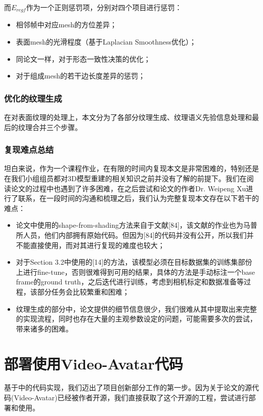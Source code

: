 \documentclass{article}
\begin{document}
而$E_{regf}$作为一个正则惩罚项，分别对四个项目进行惩罚：

\begin{itemize}
	\item 相邻帧中对应mesh的方位差异；
	\item 表面mesh的光滑程度（基于Laplacian Smoothness优化）；
	\item 同论文\cite{paper1}一样，对于形态一致性决策的优化；
	\item 对于组成mesh的若干边长度差异的惩罚；
\end{itemize}

\subsubsection{优化的纹理生成}
在对表面纹理的处理上，本文分为了各部分纹理生成、纹理语义先验信息处理和最后的纹理合并三个步骤。
\subsubsection{复现难点总结}
坦白来说，作为一个课程作业，在有限的时间内复现本文是非常困难的，特别还是在我们小组组员都对3D模型重建的相关知识之前并没有了解的前提下。我们在阅读论文的过程中也遇到了许多困难，在之后尝试和论文的作者Dr. Weipeng Xu进行了联系，在一段时间的沟通和梳理之后，我们认为完整复现本文存在以下若干的难点：

\begin{itemize}
	\item 论文中使用的shape-from-shading方法来自于文献[84]，该文献的作业也为马普所人员，他们内部拥有原始代码。但因为[84]的代码并没有公开，所以我们并不能直接使用，而对其进行复现的难度也较大；
	\item 对于Section 3.2中使用的[14]的方法，该模型必须在目标数据集的训练集部份上进行fine-tune，否则很难得到可用的结果，具体的方法是手动标注一个base frame的ground truth，之后迭代进行训练，考虑到相机标定和数据准备等过程，该部分任务会比较繁重和困难；
	\item 纹理生成的部分中，论文提供的细节信息很少，我们很难从其中提取出来完整的实现流程，同时也存在大量的主观参数设定的问题，可能需要多次的尝试，带来诸多的困难。
\end{itemize}

\section{部署使用Video-Avatar代码}
基于\cite{paper1code}中的代码实现，我们迈出了项目创新部分工作的第一步。因为关于论文\cite{paper1}的源代码(Video-Avatar)已经被作者开源\cite{paper1code}，我们直接获取了这个开源的工程，尝试进行部署和使用。
\end{document}
